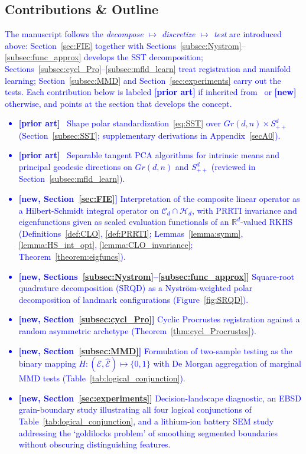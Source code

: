\documentclass[pdflatex,iicol]{sn-jnl}%
\theoremstyle{thmstyleone}%
\theoremstyle{thmstyletwo}%
\theoremstyle{thmstylethree}%
\begin{document}
\subsection{Contributions \& Outline}
\textcolor{blue}{The manuscript follows the \emph{decompose $\mapsto$ discretize $\mapsto$ test} arc introduced above: Section~\ref{sec:FIE} together with Sections~\ref{subsec:Nystrom}--\ref{subsec:func_approx} develops the SST decomposition; Sections~\ref{subsec:cycl_Pro}--\ref{subsec:mfld_learn} treat registration and manifold learning; Section~\ref{subsec:MMD} and Section~\ref{sec:experiments} carry out the tests. Each contribution below is labeled \textbf{[prior art]} if inherited from~\cite{grey2023separable} or \textbf{[new]} otherwise, and points at the section that develops the concept.}

\textcolor{blue}{\begin{itemize}
    \item \textbf{[prior art]}~\cite{grey2023separable} Shape polar standardization~\eqref{eq:SST} over $Gr(d,n)\times S^d_{++}$ (Section~\ref{subsec:SST}; supplementary derivations in Appendix~\ref{secA0}).
    \item \textbf{[prior art]}~\cite{grey2023separable, fletcher2003statistics, fletcher2004principal, edelman1998geometry, bendokat2020grassmann} Separable tangent PCA algorithms for intrinsic means and principal geodesic directions on $Gr(d,n)$ and $S^d_{++}$ (reviewed in Section~\ref{subsec:mfld_learn}).
    \item \textbf{[new, Section~\ref{sec:FIE}]} Interpretation of the composite linear operator as a Hilbert-Schmidt integral operator on $\mathcal{C}_d\cap\mathcal{H}_d$, with PRRTI invariance and eigenfunctions given as scaled evaluation functionals of an $\mathbb{R}^d$-valued RKHS (Definitions~\ref{def:CLO}, \ref{def:PRRTI}; Lemmas~\ref{lemma:symm}, \ref{lemma:HS_int_opt}, \ref{lemma:CLO_invariance}; Theorem~\ref{theorem:eigfuncs}).
    \item \textbf{[new, Sections~\ref{subsec:Nystrom}--\ref{subsec:func_approx}]} Square-root quadrature decomposition (SRQD) as a Nystr\"om-weighted polar decomposition of landmark configurations (Figure~\ref{fig:SRQD}).
    \item \textbf{[new, Section~\ref{subsec:cycl_Pro}]} Cyclic Procrustes registration against a random asymmetric archetype (Theorem~\ref{thm:cycl_Procrustes}).
    \item \textbf{[new, Section~\ref{subsec:MMD}]} Formulation of two-sample testing as the binary mapping $H:(\mathcal{E},\widehat{\mathcal{E}})\mapsto\{0,1\}$ with De Morgan aggregation of marginal MMD tests (Table~\ref{tab:logical_conjunction}).
    \item \textbf{[new, Section~\ref{sec:experiments}]} Decision-landscape diagnostic, an EBSD grain-boundary study illustrating all four logical conjunctions of Table~\ref{tab:logical_conjunction}, and a lithium-ion battery SEM study addressing the `goldilocks problem' of smoothing segmented boundaries without obscuring distinguishing features.
\end{itemize}}
\end{document}
